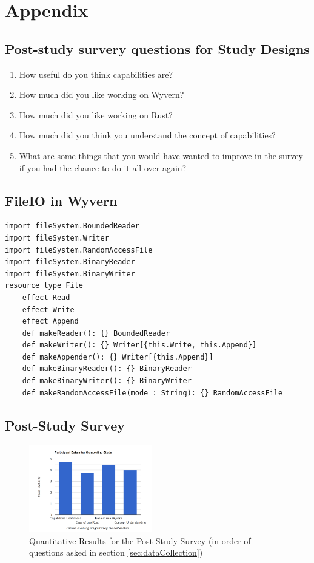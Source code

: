 \section{Appendix}\label{sec-appendix}

\subsection{Post-study survery questions for Study Designs}
\begin{enumerate}
    \item How useful do you think capabilities are?
    \item How much did you like working on Wyvern? 
    \item How much did you like working on Rust?
    \item How much did you think you understand the concept of capabilities?
    \item What are some things that you would have wanted to improve in the survey if you had the chance to do it all over again? 
\end{enumerate}

\subsection{FileIO in Wyvern}

\begin{verbatim}
import fileSystem.BoundedReader
import fileSystem.Writer
import fileSystem.RandomAccessFile
import fileSystem.BinaryReader
import fileSystem.BinaryWriter
resource type File
    effect Read
    effect Write
    effect Append
    def makeReader(): {} BoundedReader
    def makeWriter(): {} Writer[{this.Write, this.Append}]
    def makeAppender(): {} Writer[{this.Append}]
    def makeBinaryReader(): {} BinaryReader
    def makeBinaryWriter(): {} BinaryWriter
    def makeRandomAccessFile(mode : String): {} RandomAccessFile
\end{verbatim}
\label{code:fileIOwyv}

\subsection{Post-Study Survey}

\begin{figure}[htbp]
\centering
\includegraphics[width=2.1in]{figures/Quant_Results.png}
\caption{Quantitative Results for the Post-Study Survey (in order of questions asked in section \ref{sec:dataCollection}) }
\label{quantresults}
\end{figure}